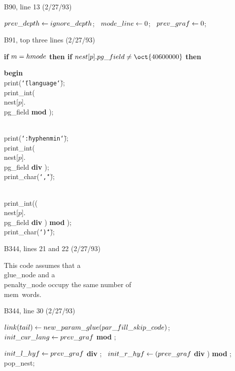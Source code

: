 \bugonpage B90, line 13 (2/27/93)

\ninepoint
\noindent\hskip10pt
$\\{prev\_depth}\gets\\{ignore\_depth}$; \ $\\{mode\_line}\gets0$; \
$\\{prev\_graf}\gets0$;

\bugonpage B91, top three lines (2/27/93)

\ninepoint
\noindent\hskip20pt
{\bf if\/} $m=\\{hmode}$ {\bf then if\/} $\\{nest}[p].\\{pg\_field}\ne
 \oct{40600000}$ {\bf then}\par\noindent\hskip40pt
{\bf begin} \\{print}({\tt\char`\"\](language\char`\"}); \
 \\{print\_int}(\\{nest}[$p$].\\{pg\_field} {\bf mod} );\par
\noindent\hskip40pt
 \\{print}({\tt\char`\":hyphenmin\char`\"}); \
 \\{print\_int}(\\{nest}[$p$].\\{pg\_field} {\bf div} ); \
 \\{print\_char}({\tt\char`\",\char`\"});\par\noindent\hskip40pt
\\{print\_int}((\\{nest}[$p$].\\{pg\_field} {\bf div} )
 {\bf mod} \oct{100}); \ \\{print\_char}({\tt\char`\")\char`\"});

\bugonpage B344, lines 21 and 22 (2/27/93)

\tenpoint\noindent\hskip10pt
This code assumes that a \\{glue\_node} and a \\{penalty\_node} occupy the
same number of \\{mem}~words.

\bugonpage B344, line 30 (2/27/93)

\ninepoint\noindent\hskip10pt
$\\{link}(\\{tail})\gets\\{new\_param\_glue}(\\{par\_fill\_skip\_code})$; \
 $\\{init\_cur\_lang}\gets\\{prev\_graf}$ {\bf mod} ;\par
\noindent\hskip10pt
$\\{init\_l\_hyf}\gets\\{prev\_graf}$ {\bf div} ; \
$\\{init\_r\_hyf}\gets(\\{prev\_graf}$ {\bf div} ) {\bf mod}
 \oct{100}; \
\\{pop\_nest};

